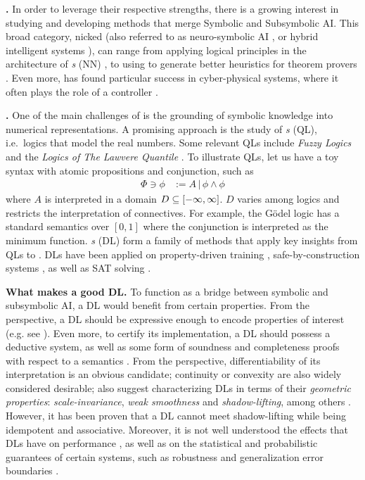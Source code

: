 \textbf{\InAI{}.} In order to leverage their respective strengths, there is a growing interest in studying and developing methods that merge Symbolic and Subsymbolic AI. This broad category, nicked \emph{\InAI{}}  \citep{Platzer_2024} (also referred to as neuro-symbolic AI \citep{d2009neural}, or hybrid intelligent systems \citep{medsker2012hybrid}), can range from applying logical principles in the architecture of \emph{ \NN{}s} (NN)  \citep{badreddine2022logic}, to using \SuAI{} to generate better heuristics for theorem provers \citep{laurent2022learning}. Even more, \InAI{} has found particular success in cyber-physical systems, where it often plays the role of a controller \citep{Platzer_2024}.

\textbf{\DL{}.} One of the main challenges of \InAI{} is the grounding of symbolic knowledge into numerical representations. A promising approach is the study of \emph{\QL{}s} (QL), i.e.~logics that model the real numbers. Some relevant QLs include \emph{Fuzzy Logics} \citep{cintula2011handbook} and the \emph{Logics of The Lawvere Quantile} \citep{bacci2023propositional}. To illustrate QLs, let us have a toy syntax with atomic propositions and conjunction, such as
\begin{equation}
\begin{split}
    \Phi \ni \phi &:= A \,|\, \phi \land \phi
\end{split}
\end{equation}
where $A$ is interpreted in a domain $D \subseteq [-\infty,\infty]$. $D$ varies among logics and restricts the interpretation of connectives. For example, the
G\"{o}del logic \citep{BAAZ200723} has a standard semantics over $[0, 1]$ where the conjunction is interpreted as the minimum function. \emph{\DL{}s} (DL) form a family of methods that apply key insights from QLs to \InAI{}. DLs have been applied on property-driven training \citep{FLINKOW2025103280}, safe-by-construction systems \citep{badreddine2022logic}, as well as SAT solving \mcita{}. 

\textbf{What makes a good DL.} To function as a bridge between symbolic and subsymbolic AI, a DL would benefit from certain properties. From the \SiAI{} perspective, a DL should be expressive enough to encode properties of interest (e.g. see \mcita{}). Even more, to certify its implementation, a DL should possess a deductive system, as well as some form of soundness and completeness proofs with respect to a semantics \mcita{}. From the \SuAI{} perspective, differentiability of its interpretation is an obvious candidate; continuity or convexity are also widely considered desirable; \mcita{} also suggest characterizing DLs in terms of their \textit{geometric properties}: \emph{scale-invariance}, \emph{weak smoothness} and \emph{shadow-lifting}, among others \mcita{}. However, it has been proven that a DL cannot meet shadow-lifting while being idempotent and associative. Moreover, it is not well understood the effects that DLs have on performance \mcita{}, as well as on the statistical and probabilistic guarantees of certain systems, such as robustness \citep{casadio2022neural} and generalization error boundaries \citep{jakubovitz2019generalization}.


